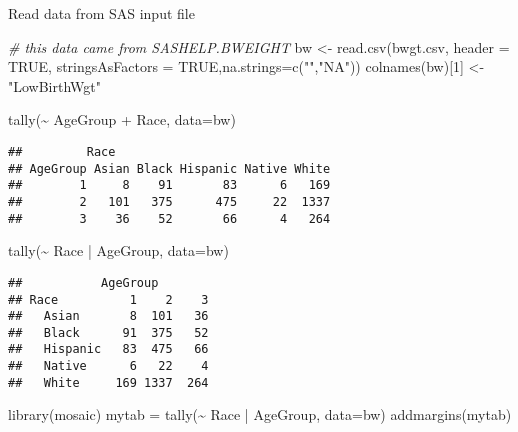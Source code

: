 \documentclass[
]{article}
\newenvironment{Shaded}{\begin{snugshade}}{\end{snugshade}}
\newcommand{\AttributeTok}[1]{\textcolor[rgb]{0.77,0.63,0.00}{#1}}
\newcommand{\CommentTok}[1]{\textcolor[rgb]{0.56,0.35,0.01}{\textit{#1}}}
\newcommand{\ConstantTok}[1]{\textcolor[rgb]{0.00,0.00,0.00}{#1}}
\newcommand{\DecValTok}[1]{\textcolor[rgb]{0.00,0.00,0.81}{#1}}
\newcommand{\FunctionTok}[1]{\textcolor[rgb]{0.00,0.00,0.00}{#1}}
\newcommand{\NormalTok}[1]{#1}
\newcommand{\OtherTok}[1]{\textcolor[rgb]{0.56,0.35,0.01}{#1}}
\newcommand{\SpecialCharTok}[1]{\textcolor[rgb]{0.00,0.00,0.00}{#1}}
\newcommand{\StringTok}[1]{\textcolor[rgb]{0.31,0.60,0.02}{#1}}
\begin{document}
Read data from SAS input file

\begin{Shaded}
\begin{Highlighting}[]
\CommentTok{\# this data came from SASHELP.BWEIGHT}
\NormalTok{bw }\OtherTok{\textless{}{-}} \FunctionTok{read.csv}\NormalTok{(}\StringTok{\textquotesingle{}bwgt.csv\textquotesingle{}}\NormalTok{, }\AttributeTok{header =} \ConstantTok{TRUE}\NormalTok{, }\AttributeTok{stringsAsFactors =} \ConstantTok{TRUE}\NormalTok{,}\AttributeTok{na.strings=}\FunctionTok{c}\NormalTok{(}\StringTok{""}\NormalTok{,}\StringTok{"NA"}\NormalTok{))}
\FunctionTok{colnames}\NormalTok{(bw)[}\DecValTok{1}\NormalTok{] }\OtherTok{\textless{}{-}} \StringTok{"LowBirthWgt"}
\end{Highlighting}
\end{Shaded}

\begin{Shaded}
\begin{Highlighting}[]
\FunctionTok{tally}\NormalTok{(}\SpecialCharTok{\textasciitilde{}}\NormalTok{ AgeGroup }\SpecialCharTok{+}\NormalTok{ Race, }\AttributeTok{data=}\NormalTok{bw)}
\end{Highlighting}
\end{Shaded}

\begin{verbatim}
##         Race
## AgeGroup Asian Black Hispanic Native White
##        1     8    91       83      6   169
##        2   101   375      475     22  1337
##        3    36    52       66      4   264
\end{verbatim}

\begin{Shaded}
\begin{Highlighting}[]
\FunctionTok{tally}\NormalTok{(}\SpecialCharTok{\textasciitilde{}}\NormalTok{ Race }\SpecialCharTok{|}\NormalTok{ AgeGroup, }\AttributeTok{data=}\NormalTok{bw)}
\end{Highlighting}
\end{Shaded}

\begin{verbatim}
##           AgeGroup
## Race          1    2    3
##   Asian       8  101   36
##   Black      91  375   52
##   Hispanic   83  475   66
##   Native      6   22    4
##   White     169 1337  264
\end{verbatim}

\begin{Shaded}
\begin{Highlighting}[]
\FunctionTok{library}\NormalTok{(mosaic)}
\NormalTok{mytab }\OtherTok{=} \FunctionTok{tally}\NormalTok{(}\SpecialCharTok{\textasciitilde{}}\NormalTok{ Race }\SpecialCharTok{|}\NormalTok{ AgeGroup, }\AttributeTok{data=}\NormalTok{bw)}
\FunctionTok{addmargins}\NormalTok{(mytab)}
\end{Highlighting}
\end{Shaded}
\end{document}
